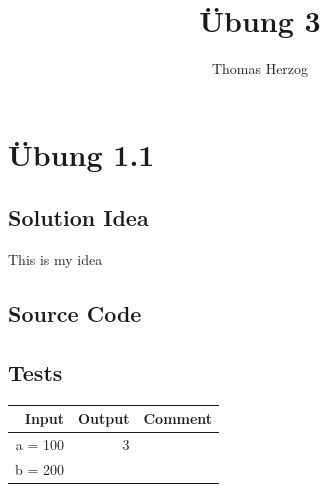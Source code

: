\documentclass[11pt, a4paper, twoside]{article}   	%
\title{Übung 3}
\author{Thomas Herzog}
\newcommand{\srcDir}{../src/main/java}
\newcommand{\mainPackage}{\srcDir/at/fhooe/swe4/lab3}
\begin{document}
\setlength{\headheight}{15mm}
{\color{myred}
	\section
		{Übung 1.1}
}

\subsection{Solution Idea}
This is my idea
\subsection{Source Code}








\subsection{Tests}


\begin{tabular}{|r|r|l|}
\hline
Input & Output & Comment \\
\hline
a = 100 & 3 & \\
b = 200 & & \\
\hline 
\end{tabular}
\end{document}
